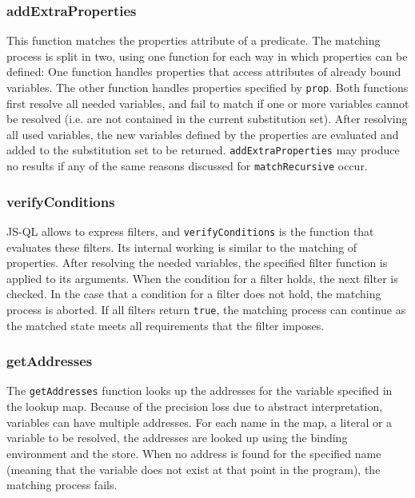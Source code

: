 \subsubsection{addExtraProperties}

This function matches the properties attribute of a predicate. The matching process is split in two, using one function for each way in which properties can be defined: One function handles properties that access attributes of already bound variables. The other function handles properties specified by \texttt{prop}. Both functions first resolve all needed variables, and fail to match if one or more variables cannot be resolved (i.e. are not contained in the current substitution set). After resolving all used variables, the new variables defined by the properties are evaluated and added to the substitution set to be returned. \texttt{addExtraProperties} may produce no results if any of the same reasons discussed for \texttt{matchRecursive} occur.

\subsubsection{verifyConditions}

JS-QL allows to express filters, and \texttt{verifyConditions} is the function that evaluates these filters. Its internal working is similar to the matching of properties. After resolving the needed variables, the specified filter function is applied to its arguments. When the condition for a filter holds, the next filter is checked. In the case that a condition for a filter does not hold, the matching process is aborted. If all filters return \texttt{true}, the matching process can continue as the matched state meets all requirements that the filter imposes.

\subsubsection{getAddresses}
The \texttt{getAddresses} function looks up the addresses for the variable specified in the lookup map. Because of the precision loss due to abstract interpretation, variables can have multiple addresses. For each name in the map, a literal or a variable to be resolved, the addresses are looked up using the binding environment and the store. When no address is found for the specified name (meaning that the variable does not exist at that point in the program), the matching process fails.


